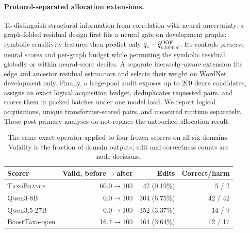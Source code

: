 \documentclass[11pt]{article}
\newcommand{\method}{\textsc{TaxoBranch}}
\begin{document}
\paragraph{Protocol-separated allocation extensions.}
To distinguish structural information from correlation with neural
uncertainty, a graph-folded residual design first fits a neural gate on
development graphs; symbolic sensitivity features then predict only
$q_c-\widehat q_{c,\rm neural}^{\rm OOF}$. Its controls preserve neural scores and
per-graph budget while permuting the symbolic residual globally or within
neural-score deciles. A separate hierarchy-aware extension fits edge and
ancestor residual estimators and selects their weight on WordNet development
only. Finally, a large-pool audit exposes up to 200 dense candidates, assigns an
exact logical acquisition budget, deduplicates requested pairs, and scores them
in packed batches under one model load. We report logical acquisitions, unique
transformer-scored pairs, and measured runtime separately. These post-primary
analyses do not replace the untouched allocation result.

\begin{table}[h]
\centering
\scriptsize
\setlength{\tabcolsep}{3.2pt}
\begin{tabular}{lrrr}
\toprule
Scorer & Valid, before$\to$after & Edits & Correct/harm\\
\midrule
\method{} & 60.0$\to$100 & 42 (0.19\%) & 5 / 2\\
Qwen3-8B & 0.0$\to$100 & 304 (6.75\%) & 42 / 42\\
Qwen3.5-27B & 0.0$\to$100 & 152 (3.37\%) & 14 / 9\\
BoostTaxo-open & 16.7$\to$100 & 164 (3.64\%) & 12 / 17\\
\bottomrule
\end{tabular}
\caption{The same exact operator applied to four frozen scorers on all six
domains. Validity is the fraction of domain outputs; edit and correctness
counts are node decisions.}
\label{tab:cross-scorer}
\end{table}
\end{document}
